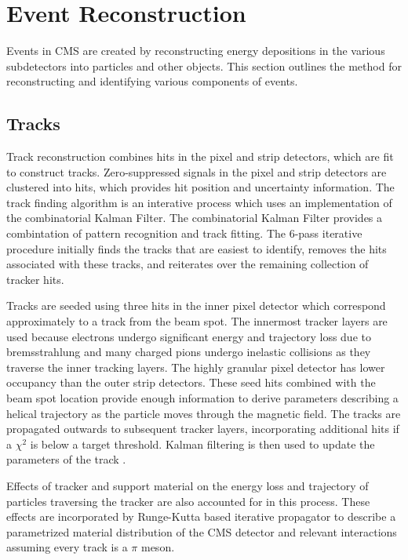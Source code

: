 \chapter{Event Reconstruction}\label{ch:reco}
Events in CMS are created by reconstructing energy depositions in the various subdetectors into particles and other objects. This section outlines the method for reconstructing and identifying various components of events.

\section{Tracks}
Track reconstruction combines hits in the pixel and strip detectors, which are fit to construct tracks. Zero-suppressed signals in the pixel and strip detectors are clustered into hits, which provides hit position and uncertainty information. The track finding algorithm is an interative process which uses an implementation of the combinatorial Kalman Filter. The combinatorial Kalman Filter provides a combintation of pattern recognition and track fitting. The 6-pass iterative procedure initially finds the tracks that are easiest to identify, removes the hits associated with these tracks, and reiterates over the remaining collection of tracker hits. \cite{Chatrchyan:2014fea}

 Tracks are seeded using three hits in the inner pixel detector which correspond approximately to a track from the beam spot. The innermost tracker layers are used because electrons undergo significant energy and trajectory loss due to bremsstrahlung and many charged pions undergo inelastic collisions as they traverse the inner tracking layers. The highly granular pixel detector has lower occupancy than the outer strip detectors. These seed hits combined with the beam spot location provide enough information to derive parameters describing a helical trajectory as the particle moves through the magnetic field. The tracks are propagated outwards to subsequent tracker layers, incorporating additional hits if a $\chi^2$ is below a target threshold. Kalman filtering is then used to update the parameters of the track \cite{Adam:2005cg}. 

Effects of tracker and support material on the energy loss and trajectory of particles traversing the tracker are also accounted for in this process. These effects are incorporated by Runge-Kutta based iterative propagator to describe a parametrized material distribution of the CMS detector and relevant interactions assuming every track is a $\pi$ meson. 

